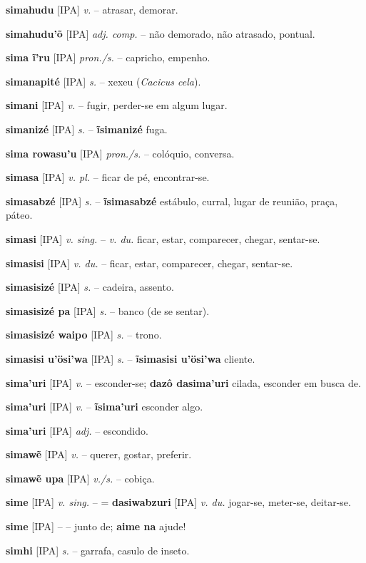 \textbf{simahudu} [IPA] \textit{v.} -- atrasar, demorar.

\textbf{simahudu'õ} [IPA] \textit{adj. comp.} -- não demorado, não atrasado, pontual.

\textbf{sima ĩ'ru} [IPA] \textit{pron./s.} -- capricho, empenho.

\textbf{simanapité} [IPA] \textit{s.} -- xexeu (\textit{Cacicus cela}).

\textbf{simani} [IPA] \textit{v.} -- fugir, perder-se em algum lugar.

\textbf{simanizé} [IPA] \textit{s.} -- \textbf{ĩsimanizé} fuga.

\textbf{sima rowasu'u} [IPA] \textit{pron./s.} -- colóquio, conversa.

\textbf{simasa} [IPA] \textit{v. pl.} -- ficar de pé, encontrar-se.

\textbf{simasabzé} [IPA] \textit{s.} -- \textbf{ĩsimasabzé} estábulo, curral, lugar de reunião, praça, páteo.

\textbf{simasi} [IPA] \textit{v. sing.} -- \textit{v. du.} ficar, estar, comparecer, chegar, sentar-se.

\textbf{simasisi} [IPA] \textit{v. du.} -- ficar, estar, comparecer, chegar, sentar-se.

\textbf{simasisizé} [IPA] \textit{s.} -- cadeira, assento.

\textbf{simasisizé pa} [IPA] \textit{s.} -- banco (de se sentar).

\textbf{simasisizé waipo} [IPA] \textit{s.} -- trono.

\textbf{simasisi u'ösi'wa} [IPA] \textit{s.} -- \textbf{ĩsimasisi u'ösi'wa} cliente.

\textbf{sima'uri} [IPA] \textit{v.} -- esconder-se; \textbf{dazô dasima'uri} cilada, esconder em busca de.

\textbf{sima'uri} [IPA] \textit{v.} -- \textbf{ĩsima'uri} esconder algo.

\textbf{sima'uri} [IPA] \textit{adj.} -- escondido.

\textbf{simawẽ} [IPA] \textit{v.} -- querer, gostar, preferir.

\textbf{simawẽ upa} [IPA] \textit{v./s.} -- cobiça.

\textbf{sime} [IPA] \textit{v. sing.} -- = \textbf{dasiwabzuri} [IPA] \textit{v. du.} jogar-se, meter-se, deitar-se.

\textbf{sime} [IPA] \textit{} -- -- junto de; \textbf{aime na} ajude!

\textbf{simhi} [IPA] \textit{s.} -- garrafa, casulo de inseto.

